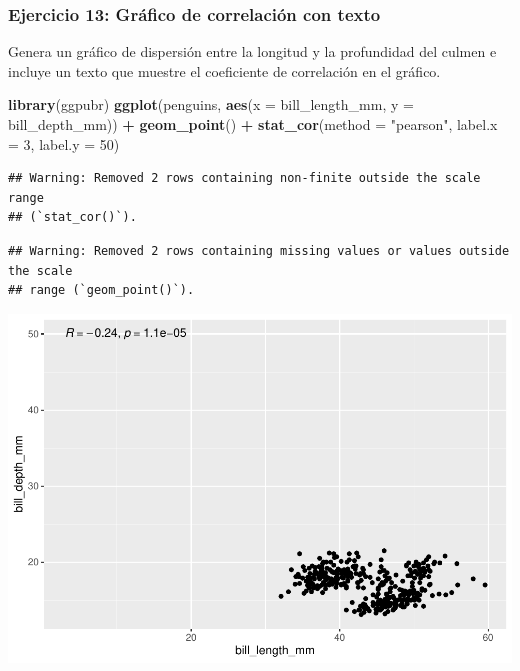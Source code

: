 \documentclass[
]{book}
\newenvironment{Shaded}{\begin{snugshade}}{\end{snugshade}}
\newcommand{\AttributeTok}[1]{\textcolor[rgb]{0.13,0.29,0.53}{#1}}
\newcommand{\DecValTok}[1]{\textcolor[rgb]{0.00,0.00,0.81}{#1}}
\newcommand{\FunctionTok}[1]{\textcolor[rgb]{0.13,0.29,0.53}{\textbf{#1}}}
\newcommand{\NormalTok}[1]{#1}
\newcommand{\SpecialCharTok}[1]{\textcolor[rgb]{0.81,0.36,0.00}{\textbf{#1}}}
\newcommand{\StringTok}[1]{\textcolor[rgb]{0.31,0.60,0.02}{#1}}
\begin{document}
\subsubsection{Ejercicio 13: Gráfico de correlación con texto}\label{ejercicio-13-gruxe1fico-de-correlaciuxf3n-con-texto}

Genera un gráfico de dispersión entre la longitud y la profundidad del culmen e incluye un texto que muestre el coeficiente de correlación en el gráfico.

\begin{Shaded}
\begin{Highlighting}[]
\FunctionTok{library}\NormalTok{(ggpubr)}
\FunctionTok{ggplot}\NormalTok{(penguins, }\FunctionTok{aes}\NormalTok{(}\AttributeTok{x =}\NormalTok{ bill\_length\_mm, }\AttributeTok{y =}\NormalTok{ bill\_depth\_mm)) }\SpecialCharTok{+}
  \FunctionTok{geom\_point}\NormalTok{() }\SpecialCharTok{+}
  \FunctionTok{stat\_cor}\NormalTok{(}\AttributeTok{method =} \StringTok{"pearson"}\NormalTok{, }\AttributeTok{label.x =} \DecValTok{3}\NormalTok{, }\AttributeTok{label.y =} \DecValTok{50}\NormalTok{)}
\end{Highlighting}
\end{Shaded}

\begin{verbatim}
## Warning: Removed 2 rows containing non-finite outside the scale range
## (`stat_cor()`).
\end{verbatim}

\begin{verbatim}
## Warning: Removed 2 rows containing missing values or values outside the scale
## range (`geom_point()`).
\end{verbatim}

\includegraphics{bookdown-demo_files/figure-latex/unnamed-chunk-193-1.pdf}
\end{document}
